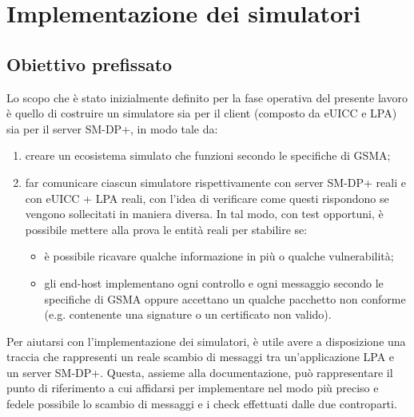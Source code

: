 \documentclass[10pt, oneside]{book}
\begin{document}
\chapter{Implementazione dei simulatori}
\section{Obiettivo prefissato}
Lo scopo che è stato inizialmente definito per la fase operativa del presente lavoro è quello di costruire un simulatore sia per il client (composto da eUICC e LPA) sia per il server SM-DP+, in modo tale da:
\begin{enumerate}
\item creare un ecosistema simulato che funzioni secondo le specifiche di GSMA;
\item far comunicare ciascun simulatore rispettivamente con server SM-DP+ reali e con eUICC + LPA reali, con l'idea di verificare come questi rispondono se vengono sollecitati in maniera diversa. In tal modo, con test opportuni, è possibile mettere alla prova le entità reali per stabilire se:
\begin{itemize}[itemsep=0pt]
\item è possibile ricavare qualche informazione in più o qualche vulnerabilità;
\item gli end-host implementano ogni controllo e ogni messaggio secondo le specifiche di GSMA oppure accettano un qualche pacchetto non conforme (e.g. contenente una signature o un certificato non valido).
\end{itemize}
\end{enumerate}
Per aiutarsi con l'implementazione dei simulatori, è utile avere a disposizione una traccia che rappresenti un reale scambio di messaggi tra un'applicazione LPA e un server SM-DP+. Questa, assieme alla documentazione, può rappresentare il punto di riferimento a cui affidarsi per implementare nel modo più preciso e fedele possibile lo scambio di messaggi e i check effettuati dalle due controparti.
\end{document}
